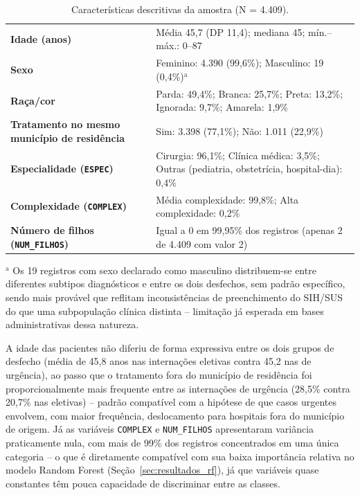 \documentclass[12pt,a4paper]{article}
\begin{document}
\begin{table}[H]
\centering
\caption{Características descritivas da amostra (N = 4.409).}
\label{tab:descritivas}
\begin{tabular}{p{5.8cm}p{7.2cm}}
\toprule
\textbf{Idade (anos)} & Média 45,7 (DP 11,4); mediana 45; mín.--máx.: 0--87 \\
\addlinespace
\textbf{Sexo} & Feminino: 4.390 (99,6\%); Masculino: 19 (0,4\%)$^{\text{a}}$ \\
\addlinespace
\textbf{Raça/cor} & Parda: 49,4\%; Branca: 25,7\%; Preta: 13,2\%; Ignorada: 9,7\%; Amarela: 1,9\% \\
\addlinespace
\textbf{Tratamento no mesmo município de residência} & Sim: 3.398 (77,1\%); Não: 1.011 (22,9\%) \\
\addlinespace
\textbf{Especialidade (\texttt{ESPEC})} & Cirurgia: 96,1\%; Clínica médica: 3,5\%; Outras (pediatria, obstetrícia, hospital-dia): 0,4\% \\
\addlinespace
\textbf{Complexidade (\texttt{COMPLEX})} & Média complexidade: 99,8\%; Alta complexidade: 0,2\% \\
\addlinespace
\textbf{Número de filhos (\texttt{NUM\_FILHOS})} & Igual a 0 em 99,95\% dos registros (apenas 2 de 4.409 com valor 2) \\
\bottomrule
\end{tabular}

\vspace{4pt}
\footnotesize $^{\text{a}}$ Os 19 registros com sexo declarado como masculino distribuem-se entre diferentes subtipos diagnósticos e entre os dois desfechos, sem padrão específico, sendo mais provável que reflitam inconsistências de preenchimento do SIH/SUS do que uma subpopulação clínica distinta -- limitação já esperada em bases administrativas dessa natureza.
\end{table}

A idade das pacientes não diferiu de forma expressiva entre os dois grupos de desfecho (média de 45,8 anos nas internações eletivas contra 45,2 nas de urgência), ao passo que o tratamento fora do município de residência foi proporcionalmente mais frequente entre as internações de urgência (28,5\% contra 20,7\% nas eletivas) -- padrão compatível com a hipótese de que casos urgentes envolvem, com maior frequência, deslocamento para hospitais fora do município de origem. Já as variáveis \texttt{COMPLEX} e \texttt{NUM\_FILHOS} apresentaram variância praticamente nula, com mais de 99\% dos registros concentrados em uma única categoria -- o que é diretamente compatível com sua baixa importância relativa no modelo Random Forest (Seção~\ref{sec:resultados_rf}), já que variáveis quase constantes têm pouca capacidade de discriminar entre as classes.
\end{document}
